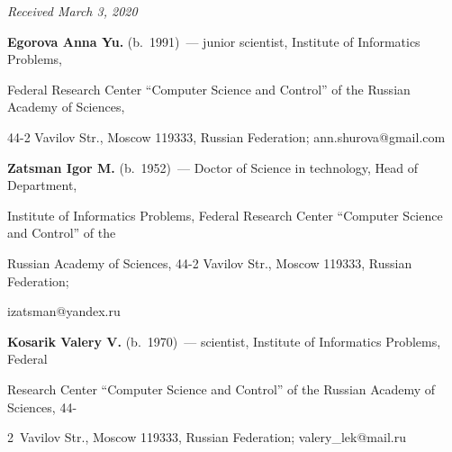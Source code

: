 \hfill{\small\textit{Received March 3, 2020}} 





\vspace*{-6pt} 





\Contr





\noindent


\textbf{Egorova Anna Yu.} (b.\ 1991)~--- junior scientist, Institute of Informatics Problems, 


Federal Research Center ``Computer Science and Control'' of the Russian Academy of Sciences, 


44-2 Vavilov Str., Moscow 119333, Russian Federation; \mbox{ann.shurova@gmail.com}





\vspace*{3pt}





\noindent


\textbf{Zatsman Igor M.} (b.\ 1952)~--- Doctor of Science in technology, Head of Department, 


Institute of Informatics Problems, Federal Research Center ``Computer Science and Control'' of the 


Russian Academy of Sciences, 44-2 Vavilov Str., Moscow 119333, Russian Federation; 


\mbox{izatsman@yandex.ru}





\vspace*{3pt}





\noindent


\textbf{Kosarik Valery V.} (b.\ 1970)~--- scientist, Institute of Informatics Problems, Federal 


Research Center ``Computer Science and Control'' of the Russian Academy of Sciences, 44-


2~Vavilov Str., Moscow 119333, Russian Federation; \mbox{valery\_lek@mail.ru}





\vspace*{3pt}





